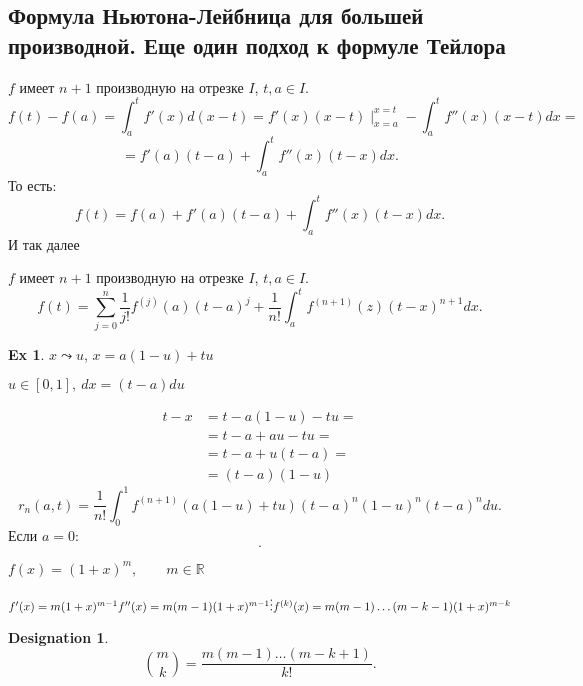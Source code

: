 \documentclass[11pt]{book}
\newcommand{\R}{\mathbb{R}}
\theoremstyle{definition}
\theoremstyle{plain}
\theoremstyle{plain}
\theoremstyle{definition}
\newtheorem*{ex}{Ex}
\newtheorem*{name}{Designation}
\theoremstyle{remark}
\begin{document}
\subsection{Формула Ньютона-Лейбница для большей производной. Еще один подход к формуле Тейлора}
$ f$ имеет $ n+1$ производную на отрезке  $ I$,  $ t, a \in I$.
\[
    f(t) - f(a) = \int_a^{t} f'(x)d(x-t) = f'(x) (x-t) \mid_{x=a}^{x=t} - \int_a^{t} f''(x)(x-t) dx =
\]
\[
    =f'(a) (t-a) +\int_a^{t}f''(x) (t-x) dx
.\]
То есть:
\[
    f(t) = f(a) + f'(a)(t-a) + \int_a^{t} f''(x) (t-x) dx
.\]
И так далее
\begin{thm}
    $ f$ имеет $ n+1$ производную на отрезке  $ I$,  $ t, a \in I$.
    \[
	f(t) = \sum_{j=0}^{n} \frac{1}{j!} f^{(j)} (a) (t-a)^{j}+ \frac{1}{n!} \int_{a}^{t} f^{(n+1)} (z) (t -x)^{n+1} dx
    .\]
\end{thm}
\begin{ex}
    $ x \leadsto  u$, $ x = a(1-u) +tu$

    $ u \in  [0, 1], ~ dx = (t-a) du$

    \begin{align*}
	t-x &= t -a(1-u) -tu = \\
	    &=t-a + au - tu =\\
	    &=t-a + u(t-a) =\\
	    &=(t-a)(1-u)
    \end{align*}
    \[
	r_n(a, t) = \frac{1}{n!} \int_{0}^{1} f^{(n+1)} (a(1-u) + tu)(t-a)^{n}(1-u)^{n}(t-a)^{n}du
    .\]
    Если $ a = 0$:
    \[
    .\]
\end{ex}
$ f(x) = (1+x)^{m}, \qquad m \in \R $

$ f'(x) = m(1+x)^{m-1} \\
f''(x) = m(m-1)(1+x)^{m-1} \\
\vdots \\
f^{(k)}(x) = m(m-1) \ldots (m-k-1) (1+x) ^{m-k}
$
\begin{name}
    \[
	{ m \choose k} = \frac{m (m-1) \ldots  (m-k+1)}{k!}
    .\]
\end{name}
\end{document}
